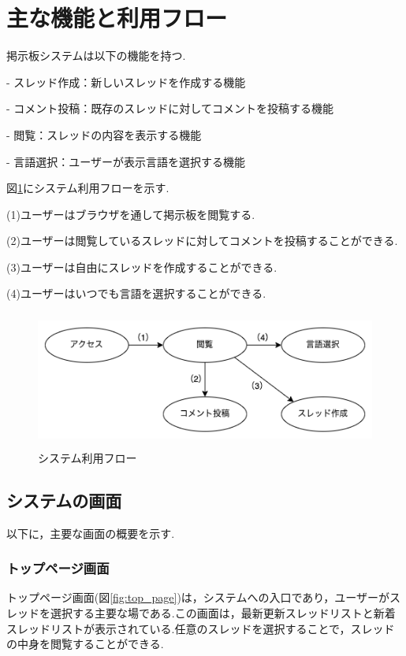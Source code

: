 \documentclass[b5paper,12pt,dvipdfmx]{jsreport}
\begin{document}
\section{主な機能と利用フロー}

掲示板システムは以下の機能を持つ.

- スレッド作成：新しいスレッドを作成する機能

- コメント投稿：既存のスレッドに対してコメントを投稿する機能

- 閲覧：スレッドの内容を表示する機能

- 言語選択：ユーザーが表示言語を選択する機能

図\ref{system_usage_flow}にシステム利用フローを示す.

(1)ユーザーはブラウザを通して掲示板を閲覧する.

(2)ユーザーは閲覧しているスレッドに対してコメントを投稿することができる.

(3)ユーザーは自由にスレッドを作成することができる.

(4)ユーザーはいつでも言語を選択することができる.

\begin{figure}[H]
	\centering
	\includegraphics[width=124mm,height=45mm]{img/system_usage_flow.png}
	\caption{システム利用フロー}
    \label{system_usage_flow}
\end{figure}


\subsection{システムの画面}

以下に，主要な画面の概要を示す.


\subsubsection{トップページ画面}
トップページ画面(図\ref{fig:top_page})は，システムへの入口であり，ユーザーがスレッドを選択する主要な場である.この画面は，最新更新スレッドリストと新着スレッドリストが表示されている.任意のスレッドを選択することで，スレッドの中身を閲覧することができる.
\end{document}

